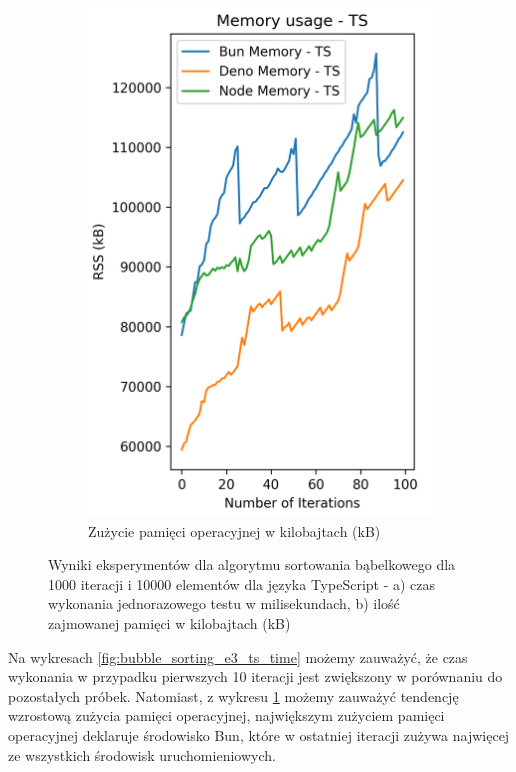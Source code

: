 \begin{figure}[H]
\begin{subfigure}[b]{0.42\textwidth}
  \end{subfigure}
  \begin{subfigure}[b]{0.42\textwidth}
    \centering
    \includegraphics[width=\textwidth]{Figures/sorting/sorting_bubble_100_10000_ts_memory.png}
    \caption{Zużycie pamięci operacyjnej w kilobajtach (kB)}
    \label{fig:bubble_sorting_e3_ts_memory}
  \end{subfigure}
  \caption{Wyniki eksperymentów dla algorytmu sortowania bąbelkowego dla 1000 iteracji i 10000 elementów dla języka TypeScript - a) czas wykonania jednorazowego testu w milisekundach, b) ilość zajmowanej pamięci w kilobajtach (kB)}
  \label{fig:bubble_sorting_e3_ts}
\end{figure}

Na wykresach \ref{fig:bubble_sorting_e3_ts_time} możemy zauważyć, że czas wykonania w przypadku pierwszych 10 iteracji jest zwiększony w porównaniu do pozostałych próbek. Natomiast, z wykresu \ref{fig:bubble_sorting_e3_ts_memory} możemy zauważyć tendencję wzrostową zużycia pamięci operacyjnej, największym zużyciem pamięci operacyjnej deklaruje środowisko Bun, które w ostatniej iteracji zużywa najwięcej ze wszystkich środowisk uruchomieniowych.

